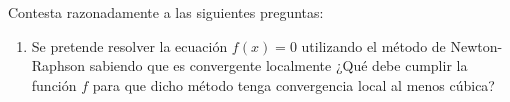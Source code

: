 \begin{ejercicio}
    Contesta razonadamente a las siguientes preguntas:
    \begin{enumerate}
        \item Se pretende resolver la ecuación $f(x) = 0$ utilizando el método de Newton-Raphson sabiendo que es convergente localmente ¿Qué debe cumplir la función $f$ para que dicho método tenga convergencia local al menos cúbica?
        \begin{comment}
        Definimos la función $g$ auxiliar siguiente:
        \Func{g}{\bb{R}}{\bb{R}}{x}{x - \dfrac{f(x)}{f'(x)}}

        Vemos que el método de Newton-Raphson para $f$ consiste en el método iterativo para $g$.
        Por tanto, estudiaremos el orden de convergencia para $g$.
        Supongamos $f\in \cc{C}^4(\bb{R})$ (algo que no es muy restrictivo por las funciones que se suelen estudiar en cálculo numérico).
        Sea $s$ la raíz de multiplicidad $m\in \bb{N}$ de $f$ a la que converge el método. Entonces:
        \begin{equation*}
            f(x)=(x-s)^mq(x)\qquad q(s)\neq 0
        \end{equation*}
        Calculamos ahora cada una de las derivadas de $f$:
        \begin{align*}
            f'(x)&=m(x-s)^{m-1}q(x)+(x-s)^mq'(x)
            = (x-s)^{m-1}[mq(x)+(x-s)q'(x)]\\
            f''(x)&=(m-1)(x-s)^{m-2}[mq(x)+(x-s)q'(x)]+\\&\hspace{3cm}+(x-s)^{m-1}[(m+1)q'(x)+(x-s)q''(x)]
        \end{align*}
        Calculamos ahora cada una de las derivadas de $g$:
        \begin{align*}
            g(x) &= x - \dfrac{f(x)}{f'(x)} = x - \dfrac{(x-s)^mq(x)}{(x-s)^{m-1}[mq(x)+(x-s)q'(x)]}
            = x - \dfrac{(x-s)q(x)}{mq(x)+(x-s)q'(x)}\\
            g'(x) &= 1 - \dfrac{f'(x)f'(x) - f(x)f''(x)}{f'(x)^2} = \dfrac{f(x)f''(x)}{f'(x)^2}
            =\\&= \dfrac{(x-s)^mq(x)}{[(x-s)^{m-1}[mq(x)+(x-s)q'(x)]]^2}
            \cdot\left[ \dfrac{(m-1)(x-s)^{m-2}[mq(x)+(x-s)q'(x)]}{[(x-s)^{m-1}[mq(x)+(x-s)q'(x)]]^2}\right.
            +\\&\hspace{2cm}\left.+ \dfrac{(x-s)^{m-1}[(m+1)q'(x)+(x-s)q''(x)]}{[(x-s)^{m-1}[mq(x)+(x-s)q'(x)]]^2}\right]

\end{comment}
\end{enumerate}
\end{ejercicio}
